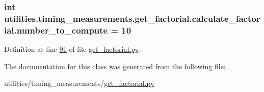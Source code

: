 \subsubsection[{number\+\_\+to\+\_\+compute}]{\setlength{\rightskip}{0pt plus 5cm}int utilities.\+timing\+\_\+measurements.\+get\+\_\+factorial.\+calculate\+\_\+factorial.\+number\+\_\+to\+\_\+compute = 10\hspace{0.3cm}{\ttfamily [static]}}\label{classutilities_1_1timing__measurements_1_1get__factorial_1_1calculate__factorial_a04cd527a2af28e713e8665e2d40b1fae}


Definition at line \hyperlink{get__factorial_8py_source_l00091}{91} of file \hyperlink{get__factorial_8py_source}{get\+\_\+factorial.\+py}.



The documentation for this class was generated from the following file\+:\begin{DoxyCompactItemize}
\item 
utilities/timing\+\_\+measurements/\hyperlink{get__factorial_8py}{get\+\_\+factorial.\+py}\end{DoxyCompactItemize}
